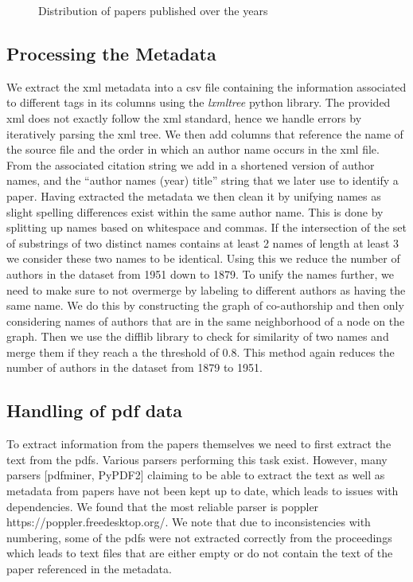 \documentclass[journal,twocolumn]{IEEEtran}
\begin{document}
    \begin{figure}
        \begin{center}\end{center}
        \caption{Distribution of papers published over the years}
        \label{fig1}
    \end{figure}
    
    \hypertarget{processing-the-metadata}{%
\subsection{Processing the Metadata}\label{processing-the-metadata}}

We extract the xml metadata into a csv file containing the information
associated to different tags in its columns using the \emph{lxmltree}
python library. The provided xml does not exactly follow the xml
standard, hence we handle errors by iteratively parsing the xml tree. We
then add columns that reference the name of the source file and the
order in which an author name occurs in the xml file. From the
associated citation string we add in a shortened version of author
names, and the ``author names (year) title'' string that we later use to
identify a paper. Having extracted the metadata we then clean it by
unifying names as slight spelling differences exist within the same
author name. This is done by splitting up names based on whitespace and
commas. If the intersection of the set of substrings of two distinct
names contains at least 2 names of length at least 3 we consider these
two names to be identical. Using this we reduce the number of authors in
the dataset from 1951 down to 1879. To unify the names further, we need
to make sure to not overmerge by labeling to different authors as having
the same name. We do this by constructing the graph of co-authorship and
then only considering names of authors that are in the same neighborhood
of a node on the graph. Then we use the difflib library to check for
similarity of two names and merge them if they reach a the threshold of
0.8. This method again reduces the number of authors in the dataset from
1879 to 1951.

    \hypertarget{handling-of-pdf-data}{%
\subsection{Handling of pdf data}\label{handling-of-pdf-data}}

To extract information from the papers themselves we need to first
extract the text from the pdfs. Various parsers performing this task
exist. However, many parsers {[}pdfminer, PyPDF2{]} claiming to be able
to extract the text as well as metadata from papers have not been kept
up to date, which leads to issues with dependencies. We found that the
most reliable parser is poppler https://poppler.freedesktop.org/. We
note that due to inconsistencies with numbering, some of the pdfs were
not extracted correctly from the proceedings which leads to text files
that are either empty or do not contain the text of the paper referenced
in the metadata.
\end{document}
